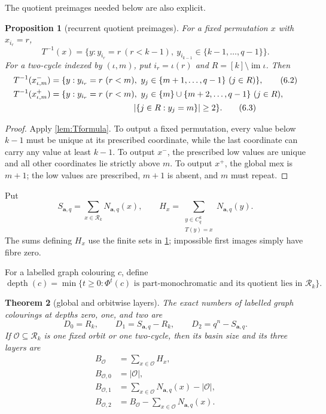 \documentclass[11pt,a4paper]{amsart}
\newtheorem{theorem}{Theorem}[section]
\newtheorem{proposition}[theorem]{Proposition}
\theoremstyle{definition}
\theoremstyle{remark}
\newcommand{\PhiG}{\Phi}
\newcommand{\Cq}{C_q}
\newcommand{\Rec}{\mathcal R}
\newcommand{\depth}{\operatorname{depth}}
\begin{document}
The quotient preimages needed below are also explicit.

\begin{proposition}[recurrent quotient preimages]\label{prop:preimages}
For a fixed permutation \(x\) with \(x_{i_r}=r\),
\[
 T^{-1}(x)=
 \{y:y_{i_r}=r\ (r<k-1),\
       y_{i_{k-1}}\in\{k-1,\ldots,q-1\}\}.               \tag{6.1}
\]
For a two-cycle indexed by \((\iota,m)\),
put \(i_r=\iota(r)\) and
\(R=[k]\setminus\operatorname{im}\iota\).  Then
\begin{align}
 T^{-1}(x^-_{\iota,m})
 &=\{y:y_{i_r}=r\ (r<m),\
 y_j\in\{m+1,\ldots,q-1\}\ (j\in R)\},                  \tag{6.2}\\
 T^{-1}(x^+_{\iota,m})
 &=\{y:y_{i_r}=r\ (r<m),\
 y_j\in\{m\}\cup\{m+2,\ldots,q-1\}\ (j\in R),\nonumber\\
 &\hspace{35mm}|\{j\in R:y_j=m\}|\ge2\}.                \tag{6.3}
\end{align}
\end{proposition}

\begin{proof}
Apply \cref{lem:Tformula}.  To output a fixed permutation, every value below
\(k-1\) must be unique at its prescribed coordinate, while the last
coordinate can carry any value at least \(k-1\).  To output \(x^-\), the
prescribed low values are unique and all other coordinates lie strictly
above \(m\).  To output \(x^+\), the global mex is \(m+1\); the low values
are prescribed, \(m+1\) is absent, and \(m\) must repeat.
\end{proof}

Put
\[
 S_{\mathbf a,q}=\sum_{x\in\Rec_k}N_{\mathbf a,q}(x),
\qquad
 H_x=\sum_{\substack{y\in\Cq^k\\T(y)=x}}N_{\mathbf a,q}(y).
\]
The sums defining \(H_x\) use the finite sets in
\cref{prop:preimages}; impossible first images simply have fibre zero.

For a labelled graph colouring \(c\), define
\[
 \depth(c)=\min\{t\ge0:\PhiG^t(c)\text{ is part-monochromatic and its
 quotient lies in }\Rec_k\}.
\]

\begin{theorem}[global and orbitwise layers]\label{thm:basins}
The exact numbers of labelled graph colourings at depths zero, one, and two
are
\[
 \boxed{D_0=R_k,\qquad
 D_1=S_{\mathbf a,q}-R_k,\qquad
 D_2=q^n-S_{\mathbf a,q}.}                              \tag{6.4}
\]
If \(\mathcal O\subseteq\Rec_k\) is one fixed orbit or one two-cycle, then
its basin size and its three layers are
\begin{align}
 B_{\mathcal O}&=\sum_{x\in\mathcal O}H_x,               \tag{6.5}\\
 B_{\mathcal O,0}&=|\mathcal O|,                         \tag{6.6}\\
 B_{\mathcal O,1}
 &=\sum_{x\in\mathcal O}N_{\mathbf a,q}(x)-|\mathcal O|, \tag{6.7}\\
 B_{\mathcal O,2}
 &=B_{\mathcal O}-\sum_{x\in\mathcal O}
 N_{\mathbf a,q}(x).                                    \tag{6.8}
\end{align}
\end{theorem}
\end{document}
